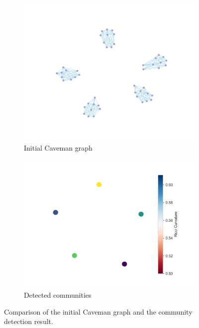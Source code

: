 \begin{figure}[ht!]
    \centering
    \begin{subfigure}[b]{0.45\textwidth}
        \centering
        \includegraphics[width=\textwidth]{Graphics/ToyModelResults/Caveman_resluts/BeforeRicciFlow.png}
        \caption{Initial Caveman graph}
        \label{fig:caveman_initial}
    \end{subfigure}
    \hfill
    \begin{subfigure}[b]{0.45\textwidth}
        \centering
        \includegraphics[width=\textwidth]{Graphics/ToyModelResults/Caveman_resluts/Communities.png}
        \caption{Detected communities}
        \label{fig:caveman_result}
    \end{subfigure}
    \caption{Comparison of the initial Caveman graph and the community detection result.}
    \label{fig4}
\end{figure}